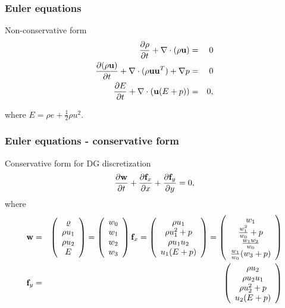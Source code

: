 \documentclass{beamer}
\begin{document}
\begin{frame}
\frametitle{Euler equations}
Non-conservative form
\begin{eqnarray}
{\partial\rho\over\partial t} + \nabla\cdot(\rho{\bf u}) & = & 0 \\
{\partial(\rho{\bf u})\over\partial t} + \nabla\cdot(\rho{\bf u}{\bf u}^T) + \nabla p & = & 0\\
{\partial E\over\partial t} + \nabla\cdot({\bf u}(E+p)) & = & 0,
\end{eqnarray}
\begin{center}
where $E = \rho e + \frac{1}{2} \rho u^2$.
\end{center}
\end{frame}
\begin{frame}
\frametitle{Euler equations - conservative form}
Conservative form for DG discretization
\begin{equation}
\label{conservative}
{\partial{\bf w}\over \partial t} +{\partial{\bf f}_x\over \partial x} +{\partial{\bf f}_y\over \partial y} = 0,
\end{equation}
\vspace{-2mm}
where
\begin{eqnarray}
\nonumber
{\bf w} & = &\left(\begin{array}{c} \varrho\\ \rho u_1\\ \rho u_2\\ E \end{array} \right) 
		  = \left(\begin{array}{c} w_0 \\ w_1 \\ w_2 \\ w_3 \\ \end{array} \right)
{\bf f}_x = \left(\begin{array}{c} \rho u_1\\ \rho u_1^2 + p \\ \rho u_1 u_2\\ u_1(E+p) \end{array} \right)
			 = \left(\begin{array}{c} w_1\\ \frac{w_1^2}{w_0} + p\\ \frac{w_1w_2}{w_0}\\ \frac{w_1}{w_0}(w_3+p) \end{array} \right)\\
{\bf f}_y & = & \left(\begin{array}{c} \rho u_2\\ \rho u_2 u_1\\ \rho u_2^2 + p\\ u_2(E+p) \end{array} \right) 

\end{eqnarray}
\end{frame}
\end{document}
